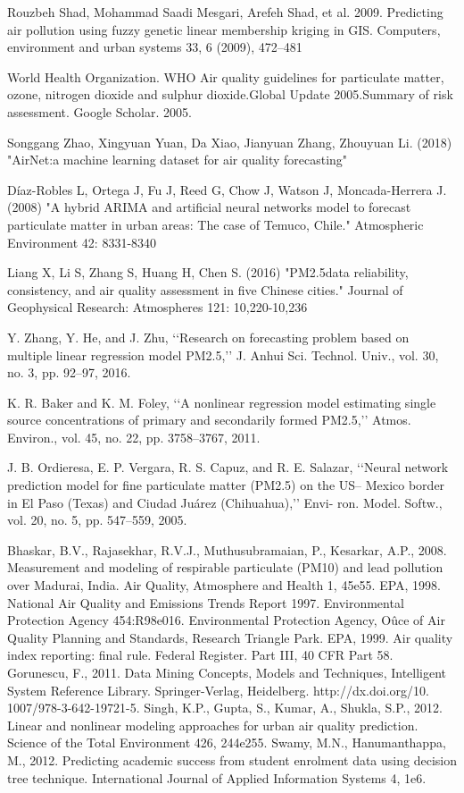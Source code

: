 \begin{thebibliography}{99}
Rouzbeh Shad, Mohammad Saadi Mesgari, Arefeh Shad, et al. 2009. Predicting
air pollution using fuzzy genetic linear membership kriging in GIS. Computers,
environment and urban systems 33, 6 (2009), 472–481

World Health Organization. WHO Air quality guidelines for particulate matter, ozone, nitrogen dioxide and sulphur dioxide.Global Update
2005.Summary of risk assessment. Google Scholar. 2005.

Songgang Zhao, Xingyuan Yuan, Da Xiao, Jianyuan Zhang, Zhouyuan Li. (2018) "AirNet:a machine learning dataset for air quality
forecasting"

Díaz-Robles L, Ortega J, Fu J, Reed G, Chow J, Watson J, Moncada-Herrera J. (2008) "A hybrid ARIMA and artificial neural networks
model to forecast particulate matter in urban areas: The case of Temuco, Chile." Atmospheric Environment 42: 8331-8340

Liang X, Li S, Zhang S, Huang H, Chen S. (2016) "PM2.5data reliability, consistency, and air quality assessment in five Chinese cities."
Journal of Geophysical Research: Atmospheres 121: 10,220-10,236

Y. Zhang, Y. He, and J. Zhu, ‘‘Research on forecasting problem based
on multiple linear regression model PM2.5,’’ J. Anhui Sci. Technol. Univ.,
vol. 30, no. 3, pp. 92–97, 2016.

K. R. Baker and K. M. Foley, ‘‘A nonlinear regression model estimating
single source concentrations of primary and secondarily formed PM2.5,’’
Atmos. Environ., vol. 45, no. 22, pp. 3758–3767, 2011.

J. B. Ordieresa, E. P. Vergara, R. S. Capuz, and R. E. Salazar, ‘‘Neural
network prediction model for fine particulate matter (PM2.5) on the US–
Mexico border in El Paso (Texas) and Ciudad Juárez (Chihuahua),’’ Envi-
ron. Model. Softw., vol. 20, no. 5, pp. 547–559, 2005.

Bhaskar, B.V., Rajasekhar, R.V.J., Muthusubramaian, P., Kesarkar, A.P., 2008. Measurement and modeling of respirable particulate (PM10) and lead pollution over
Madurai, India. Air Quality, Atmosphere and Health 1, 45e55.
EPA, 1998. National Air Quality and Emissions Trends Report 1997. Environmental
Protection Agency 454:R98e016. Environmental Protection Agency, Oûce of Air
Quality Planning and Standards, Research Triangle Park.
EPA, 1999. Air quality index reporting: final rule. Federal Register. Part III, 40 CFR
Part 58.
Gorunescu, F., 2011. Data Mining Concepts, Models and Techniques, Intelligent
System Reference Library. Springer-Verlag, Heidelberg. http://dx.doi.org/10.
1007/978-3-642-19721-5.
Singh, K.P., Gupta, S., Kumar, A., Shukla, S.P., 2012. Linear and nonlinear modeling
approaches for urban air quality prediction. Science of the Total Environment
426, 244e255.
Swamy, M.N., Hanumanthappa, M., 2012. Predicting academic success from student
enrolment data using decision tree technique. International Journal of Applied
Information Systems 4, 1e6.

\end{thebibliography}
